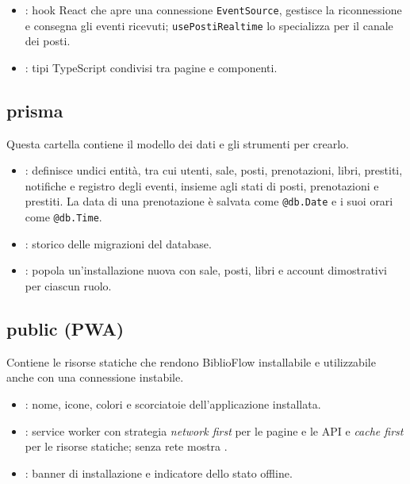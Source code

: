 \documentclass[11pt,a4paper,oneside,openany]{book}
\begin{document}
\begin{itemize}
  \item {}: hook React che apre una connessione
        \texttt{EventSource}, gestisce la riconnessione e consegna gli eventi
        ricevuti; \texttt{usePostiRealtime} lo specializza per il canale dei
        posti.
  \item {}: tipi TypeScript condivisi tra pagine e
        componenti.
\end{itemize}

\subsection{prisma}

Questa cartella contiene il modello dei dati e gli strumenti per crearlo.
\begin{itemize}
  \item {}: definisce undici entità, tra cui utenti, sale,
        posti, prenotazioni, libri, prestiti, notifiche e registro degli
        eventi, insieme agli stati di posti, prenotazioni e prestiti. La data di una prenotazione è salvata come
        \texttt{@db.Date} e i suoi orari come \texttt{@db.Time}.
  \item {}: storico delle migrazioni del database.
  \item {}: popola un'installazione nuova con sale, posti, libri e
        account dimostrativi per ciascun ruolo.
\end{itemize}


\subsection{public (PWA)}

Contiene le risorse statiche che rendono BiblioFlow installabile e
utilizzabile anche con una connessione instabile.
\begin{itemize}
  \item {}: nome, icone, colori e scorciatoie
        dell'applicazione installata.
  \item {}: service worker con strategia \emph{network first} per le
        pagine e le API e \emph{cache first} per le risorse statiche; senza
        rete mostra .
  \item {}: banner di installazione e indicatore dello
        stato offline.
\end{itemize}
\end{document}
